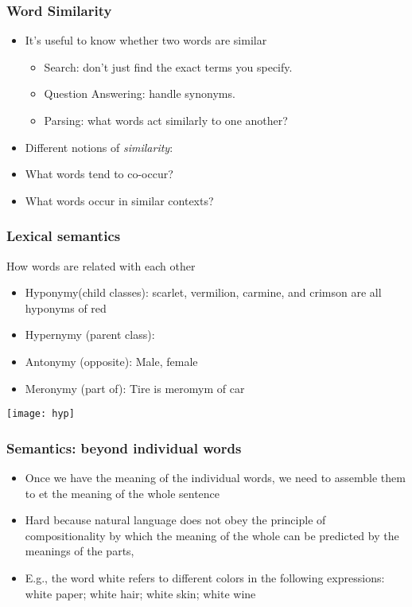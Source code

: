 \begin{frame}[fragile]\frametitle{Word Similarity}
 \begin{itemize}
 \item It's useful to know whether two words are similar
   \begin{itemize}
   \item Search: don't just find the exact terms you specify.
   \item Question Answering: handle synonyms.
   \item Parsing: what words act similarly to one another?
   \end{itemize}
 \item Different notions of \emph{similarity}:
 \item What words tend to co-occur?
 \item What words occur in similar contexts?
 \end{itemize}
\end{frame}

\begin{frame}[fragile]
  \frametitle{Lexical semantics}
  How words are related with each other
  \begin{itemize}
  \item Hyponymy(child classes): scarlet, vermilion, carmine, and crimson are all hyponyms of red  
  \item Hypernymy (parent class): 
    \item Antonymy (opposite): Male, female
  \item Meronymy (part of): Tire is meromym of car
  \end{itemize}
    \begin{center}
\texttt{[image: hyp]}
\end{center}
\end{frame}


\begin{frame}[fragile]
 \frametitle{Semantics: beyond individual words}
 \begin{itemize}
 \item Once we have the meaning of the individual words, we need to assemble them to et the meaning of the whole sentence
 \item Hard because natural language does not obey the principle of compositionality by which the meaning of the whole can be predicted by the meanings of the parts, 
 \item E.g., the word white refers to different colors in the following expressions:  
     white paper; white hair; white skin; white wine

 \end{itemize}
\end{frame}

